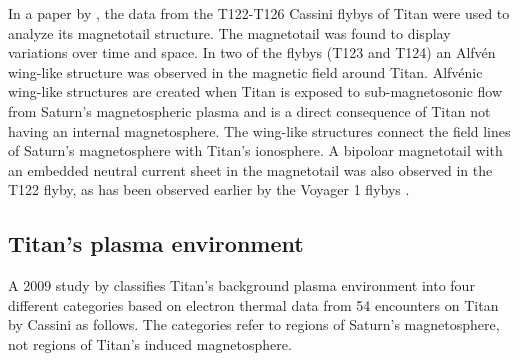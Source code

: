 \documentclass[12pt, parskip=full*, abstract]{scrartcl}
\begin{document}
In a paper by \textcite{alfven-wing-structure}, the data from the T122-T126 Cassini flybys of Titan were used to analyze its magnetotail structure. The magnetotail was found to display variations over time and space. In two of the flybys (T123 and T124) an Alfvén wing-like structure was observed in the magnetic field around Titan. Alfvénic wing-like structures are created when Titan is exposed to sub-magnetosonic flow from Saturn's magnetospheric plasma and is a direct consequence of Titan not having an internal magnetosphere. The wing-like structures connect the field lines of Saturn's magnetosphere with Titan's ionosphere. A bipoloar magnetotail with an embedded neutral current sheet in the magnetotail was also observed in the T122 flyby, as has been observed earlier by the Voyager 1 flybys \parencite{ness-1982}.

\subsection{Titan's plasma environment}
A 2009 study by \textcite{Rymer-class} classifies Titan's background plasma environment into four different categories based on electron thermal data from 54 encounters on Titan by Cassini as follows. The categories refer to regions of Saturn's magnetosphere, not regions of Titan's induced magnetosphere. 
\end{document}
